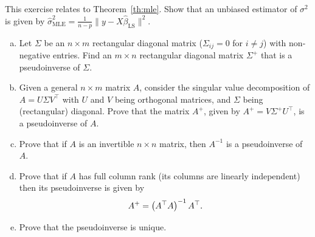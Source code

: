 \begin{myexercise}\label{ex:mse_unbiased}
This exercise relates to Theorem~\ref{th:mle}. Show that
an unbiased estimator of $\sigma^2$ is given by
$\hat{\sigma}^2_{\text{MLE}} = \frac{1}{n-p}\|y - X\hat{\beta}_{\text{LS}}\|^2$.
\end{myexercise}


\begin{myexercise}\label{prob:pseudoinverse}
    \begin{enumerate}[(a)]
        \item Let $\Sigma$ be an $n\times m$ rectangular diagonal matrix ($\Sigma_{ij}=0$ for $i\neq j$) with non-negative entries. Find an $m\times n$ rectangular diagonal matrix $\Sigma^+$ that is a pseudoinverse of $\Sigma$.
        
        \item Given a general $n \times m$ matrix $A$, consider the singular value decomposition of $A = U\Sigma V^\top  $ with $U$ and $V$ being orthogonal matrices, and $\Sigma$ being (rectangular) diagonal. Prove that the matrix $A^+$, given by $A^{+} = V\Sigma^+U^\top  $, is a pseudoinverse of $A$.
        
        \item Prove that if $A$ is an invertible $n \times n$ matrix, then $A^{-1}$ is a pseudoinverse of $A$.
        
        \item Prove that if $A$ has full column rank (its columns are linearly independent) then its pseudoinverse is given by
        \begin{equation*}
            A^{+} = \left( A^\top   A \right)^{-1} A^\top  .
        \end{equation*}
        
        \item Prove that the pseudoinverse is unique.
    \end{enumerate}
\end{myexercise}



